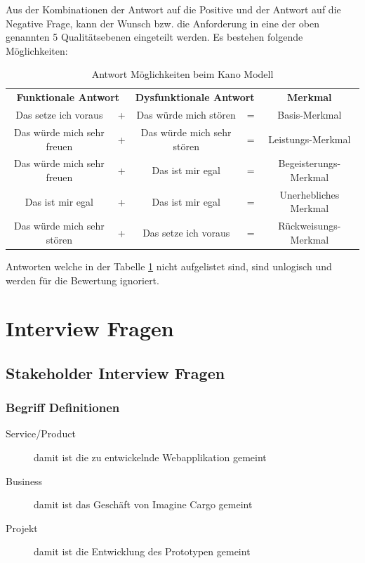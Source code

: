 Aus der Kombinationen der Antwort auf die Positive und der Antwort auf die Negative Frage, kann der Wunsch bzw. die Anforderung in eine der oben genannten 5 Qualitätsebenen eingeteilt werden. Es bestehen folgende Möglichkeiten:

\begin{table}[h!]
\centering
\label{tbl:kanoantworten}
\begin{tabular}{clclc}
\multicolumn{2}{c}{\textbf{Funktionale Antwort}} & \multicolumn{2}{c}{\textbf{Dysfunktionale Antwort}} & \textbf{Merkmal}      \\
Das setze ich voraus                & +          & Das würde mich stören                 & =           & Basis-Merkmal         \\
Das würde mich sehr freuen          & +          & Das würde mich sehr stören            & =           & Leistungs-Merkmal     \\
Das würde mich sehr freuen          & +          & Das ist mir egal                      & =           & Begeisterungs-Merkmal \\
Das ist mir egal                    & +          & Das ist mir egal                      & =           & Unerhebliches Merkmal \\
Das würde mich sehr stören          & +          & Das setze ich voraus                  & =           & Rückweisungs-Merkmal
\end{tabular}
\caption{Antwort Möglichkeiten beim Kano Modell}
\end{table}

Antworten welche in der Tabelle \ref{tbl:kanoantworten} nicht aufgelistet sind, sind unlogisch und werden für die Bewertung ignoriert.

\newpage{}
\section{Interview Fragen}
\subsection{Stakeholder Interview Fragen}
\label{subsec:stakeholderfragen}
\subsubsection{Begriff Definitionen}
\begin{description}
  \item[Service/Product] damit ist die zu entwickelnde Webapplikation gemeint
  \item[Business] damit ist das Geschäft von Imagine Cargo gemeint
  \item[Projekt] damit ist die Entwicklung des Prototypen gemeint
\end{description}

